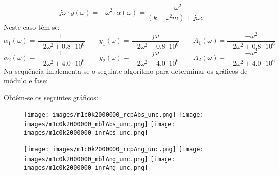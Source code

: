 \documentclass{article}
\begin{document}
\begin{resolution}
\begin{equation}
{            -j\omega   \cdot     y (\omega) = 
            - \omega^2 \cdot \alpha(\omega) = 
            \frac{-\omega^2}{(k -\omega^2 m) + j \omega c}
        }
    \end{equation}
    Neste caso têm-se:
    \begin{equation*}
        \alpha_1(\omega) = \frac{1}{-2\omega^2 + 0.8\cdot 10^6} \qquad
         y_1(\omega) = \frac{j\omega}{-2\omega^2 + 0.8\cdot 10^6} \qquad
          A_1(\omega) = \frac{-\omega^2}{-2\omega^2 + 0.8\cdot 10^6}
    \end{equation*}    \begin{equation*}
        \alpha_2(\omega) = \frac{1}{-2\omega^2 + 4.0\cdot 10^6} \qquad
         y_2(\omega) = \frac{j\omega}{-2\omega^2 + 4.0\cdot 10^6} \qquad
          A_2(\omega) = \frac{-\omega^2}{-2\omega^2 + 4.0\cdot 10^6}
    \end{equation*}
    Na sequência implementa-se o seguinte algoritmo para determinar os gráficos de módulo e fase:
    \begin{scriptsize}
        \myMatlab
    \end{scriptsize}
    Obtêm-se os seguintes gráficos:
    \begin{figure}[H]
        \centering
        \texttt{[image: images/m1c0k2000000\_rcpAbs\_unc.png]}
        \texttt{[image: images/m1c0k2000000\_mblAbs\_unc.png]}
        \texttt{[image: images/m1c0k2000000\_inrAbs\_unc.png]}
    \end{figure}
    \begin{figure}[H]
        \centering
        \texttt{[image: images/m1c0k2000000\_rcpAng\_unc.png]}
        \texttt{[image: images/m1c0k2000000\_mblAng\_unc.png]}
        \texttt{[image: images/m1c0k2000000\_inrAng\_unc.png]}
    \end{figure}
\end{resolution}
\end{document}

